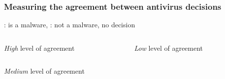 \begin{frame}
    \frametitle{Measuring the agreement between antivirus decisions}
    \centering

    \cmark: is a malware, \xmark: not a malware, \openbox{} no decision
    \vspace{-15pt}

    \begin{columns}
        \begin{column}{0.5\textwidth}
            \begin{table}[!ht]
                \resizebox{\textwidth}{!}{
                    
                }
                \smallskip{}
                \caption{\footnotesize{\textit{High} level of agreement}}
            \end{table}
        \end{column}

        \begin{column}{0.5\textwidth}
            \begin{table}[!ht]
                \resizebox{\textwidth}{!}{
                    
                }
                \smallskip{}
                \caption{\footnotesize{\textit{Low} level of agreement}}
            \end{table}
        \end{column}
    \end{columns}

    \medskip{}

    \begin{table}[!ht]
        \resizebox{0.5\textwidth}{!}{
            
        }
        \smallskip{}
        \caption{\footnotesize{\textit{Medium} level of agreement}}
    \end{table}

\end{frame}

